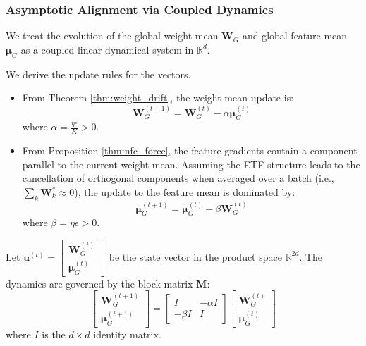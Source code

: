\documentclass{article}
\theoremstyle{plain}
\theoremstyle{definition}
\theoremstyle{remark}
\begin{document}
\subsubsection{Asymptotic Alignment via Coupled Dynamics}
\label{app:coupled_dynamics}
We treat the evolution of the global weight mean $\bm{W}_G$ and global feature mean $\bm{\mu}_G$ 
as a coupled linear dynamical system in $\mathbb{R}^d$.

We derive the update rules for the vectors.
\begin{itemize}
    \item From Theorem \ref{thm:weight_drift}, the weight mean update is:
    \begin{equation}
        \bm{W}_G^{(t+1)} = \bm{W}_G^{(t)} - \alpha \bm{\mu}_G^{(t)}
    \end{equation}
    where $\alpha = \frac{\eta \epsilon}{K} > 0$.
    \item From Proposition \ref{thm:nfc_force}, the feature gradients contain a component parallel to the current weight mean. 
    Assuming the ETF structure leads to the cancellation of orthogonal components when averaged over a batch 
    (i.e., $\sum_{k}\bm{W}_k^* \approx 0$), the update to the feature mean is dominated by:
    \begin{equation}
        \bm{\mu}_G^{(t+1)} = \bm{\mu}_G^{(t)} - \beta \bm{W}_G^{(t)}
    \end{equation}
    where $\beta = \eta \epsilon > 0$.
\end{itemize}

Let $\bm{u}^{(t)} = \begin{bmatrix} \bm{W}_G^{(t)} \\ \bm{\mu}_G^{(t)} \end{bmatrix}$ be the state vector in the product space $\mathbb{R}^{2d}$. 
The dynamics are governed by the block matrix $\mathbf{M}$:
\begin{equation}
\begin{bmatrix} \bm{W}_G^{(t+1)} \\ \bm{\mu}_G^{(t+1)} \end{bmatrix} = \begin{bmatrix} I & -\alpha I \\ -\beta I & I \end{bmatrix} \begin{bmatrix} \bm{W}_G^{(t)} \\ \bm{\mu}_G^{(t)} \end{bmatrix}
\end{equation}
where $I$ is the $d \times d$ identity matrix.
\end{document}
